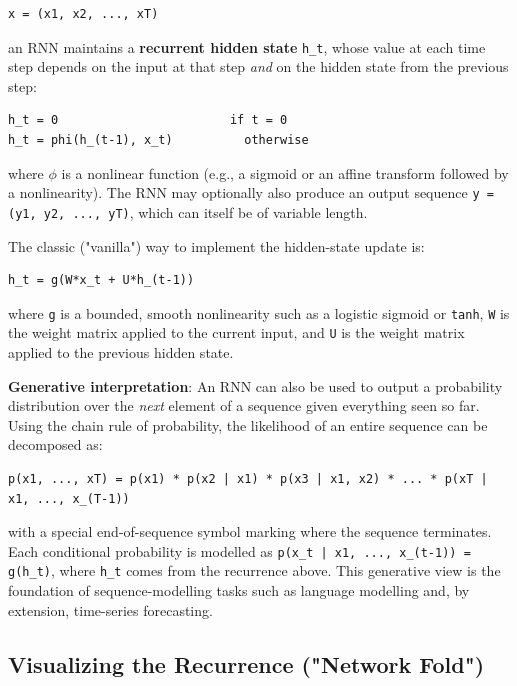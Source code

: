 \documentclass[12pt,openany]{book}
\theoremstyle{definition}
\theoremstyle{remark}
\begin{document}
\begin{lstlisting}[style=notesCode]
x = (x1, x2, ..., xT)
\end{lstlisting}

an RNN maintains a \textbf{recurrent hidden state} \texttt{h\_t}, whose value at each time step depends on the input at that step \emph{and} on the hidden state from the previous step:

\begin{lstlisting}[style=notesCode]
h_t = 0                        if t = 0
h_t = phi(h_(t-1), x_t)          otherwise
\end{lstlisting}

where \texttt{\ensuremath{\phi}} is a nonlinear function (e.g., a sigmoid or an affine transform followed by a nonlinearity). The RNN may optionally also produce an output sequence \texttt{y = (y1, y2, ..., yT)}, which can itself be of variable length.

The classic ("vanilla") way to implement the hidden-state update is:

\begin{lstlisting}[style=notesCode]
h_t = g(W*x_t + U*h_(t-1))
\end{lstlisting}

where \texttt{g} is a bounded, smooth nonlinearity such as a logistic sigmoid or \texttt{tanh}, \texttt{W} is the weight matrix applied to the current input, and \texttt{U} is the weight matrix applied to the previous hidden state.

\textbf{Generative interpretation}: An RNN can also be used to output a probability distribution over the \emph{next} element of a sequence given everything seen so far. Using the chain rule of probability, the likelihood of an entire sequence can be decomposed as:

\begin{lstlisting}[style=notesCode]
p(x1, ..., xT) = p(x1) * p(x2 | x1) * p(x3 | x1, x2) * ... * p(xT | x1, ..., x_(T-1))
\end{lstlisting}

with a special end-of-sequence symbol marking where the sequence terminates. Each conditional probability is modelled as \texttt{p(x\_t | x1, ..., x\_(t-1)) = g(h\_t)}, where \texttt{h\_t} comes from the recurrence above. This generative view is the foundation of sequence-modelling tasks such as language modelling and, by extension, time-series forecasting.

\subsection{Visualizing the Recurrence ("Network Fold")}
\end{document}
